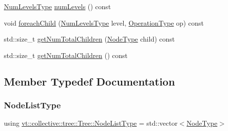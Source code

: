 \begin{DoxyCompactItemize}
\item 
\hyperlink{structvt_1_1collective_1_1tree_1_1_tree_af64acc9543dc1bd1b56d6ed17b003425}{Num\+Levels\+Type} \hyperlink{structvt_1_1collective_1_1tree_1_1_tree_a56532f6b47b9c71864980b73deee2d5a}{num\+Levels} () const
\item 
void \hyperlink{structvt_1_1collective_1_1tree_1_1_tree_a8200f03bf19b18b2323d1fcb99d5335f}{foreach\+Child} (\hyperlink{structvt_1_1collective_1_1tree_1_1_tree_af64acc9543dc1bd1b56d6ed17b003425}{Num\+Levels\+Type} level, \hyperlink{structvt_1_1collective_1_1tree_1_1_tree_a5ce4242e9580c807baa74168401f381a}{Operation\+Type} op) const
\item 
std\+::size\+\_\+t \hyperlink{structvt_1_1collective_1_1tree_1_1_tree_ac387d211dbc2689a216a3b99bc332507}{get\+Num\+Total\+Children} (\hyperlink{namespacevt_a866da9d0efc19c0a1ce79e9e492f47e2}{Node\+Type} child) const
\item 
std\+::size\+\_\+t \hyperlink{structvt_1_1collective_1_1tree_1_1_tree_a294b7827285c140d412a4344f3b135d5}{get\+Num\+Total\+Children} () const
\end{DoxyCompactItemize}


\subsection{Member Typedef Documentation}
\mbox{\label{structvt_1_1collective_1_1tree_1_1_tree_a834e7b54ea2dceae42db7c5ea859753f}} 
\subsubsection{\texorpdfstring{Node\+List\+Type}{NodeListType}}
{\footnotesize\ttfamily using \hyperlink{structvt_1_1collective_1_1tree_1_1_tree_a834e7b54ea2dceae42db7c5ea859753f}{vt\+::collective\+::tree\+::\+Tree\+::\+Node\+List\+Type} =  std\+::vector$<$\hyperlink{namespacevt_a866da9d0efc19c0a1ce79e9e492f47e2}{Node\+Type}$>$}

\mbox{\label{structvt_1_1collective_1_1tree_1_1_tree_af64acc9543dc1bd1b56d6ed17b003425}} 

